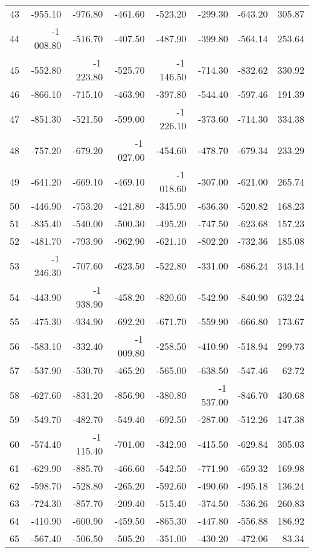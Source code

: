 \begin{longtable}{rrrrrrrr}
43 & -955.10 & -976.80 & -461.60 & -523.20 & -299.30 & -643.20 & 305.87  \\
44 & -1\,008.80 & -516.70 & -407.50 & -487.90 & -399.80 & -564.14 & 253.64  \\
45 & -552.80 & -1\,223.80 & -525.70 & -1\,146.50 & -714.30 & -832.62 & 330.92  \\
46 & -866.10 & -715.10 & -463.90 & -397.80 & -544.40 & -597.46 & 191.39  \\
47 & -851.30 & -521.50 & -599.00 & -1\,226.10 & -373.60 & -714.30 & 334.38  \\
48 & -757.20 & -679.20 & -1\,027.00 & -454.60 & -478.70 & -679.34 & 233.29  \\
49 & -641.20 & -669.10 & -469.10 & -1\,018.60 & -307.00 & -621.00 & 265.74  \\
50 & -446.90 & -753.20 & -421.80 & -345.90 & -636.30 & -520.82 & 168.23  \\
51 & -835.40 & -540.00 & -500.30 & -495.20 & -747.50 & -623.68 & 157.23  \\
52 & -481.70 & -793.90 & -962.90 & -621.10 & -802.20 & -732.36 & 185.08  \\
53 & -1\,246.30 & -707.60 & -623.50 & -522.80 & -331.00 & -686.24 & 343.14  \\
54 & -443.90 & -1\,938.90 & -458.20 & -820.60 & -542.90 & -840.90 & 632.24  \\
55 & -475.30 & -934.90 & -692.20 & -671.70 & -559.90 & -666.80 & 173.67  \\
56 & -583.10 & -332.40 & -1\,009.80 & -258.50 & -410.90 & -518.94 & 299.73  \\
57 & -537.90 & -530.70 & -465.20 & -565.00 & -638.50 & -547.46 & 62.72  \\
58 & -627.60 & -831.20 & -856.90 & -380.80 & -1\,537.00 & -846.70 & 430.68  \\
59 & -549.70 & -482.70 & -549.40 & -692.50 & -287.00 & -512.26 & 147.38  \\
60 & -574.40 & -1\,115.40 & -701.00 & -342.90 & -415.50 & -629.84 & 305.03  \\
61 & -629.90 & -885.70 & -466.60 & -542.50 & -771.90 & -659.32 & 169.98  \\
62 & -598.70 & -528.80 & -265.20 & -592.60 & -490.60 & -495.18 & 136.24  \\
63 & -724.30 & -857.70 & -209.40 & -515.40 & -374.50 & -536.26 & 260.83  \\
64 & -410.90 & -600.90 & -459.50 & -865.30 & -447.80 & -556.88 & 186.92  \\
65 & -567.40 & -506.50 & -505.20 & -351.00 & -430.20 & -472.06 & 83.34  \\

\end{longtable}
